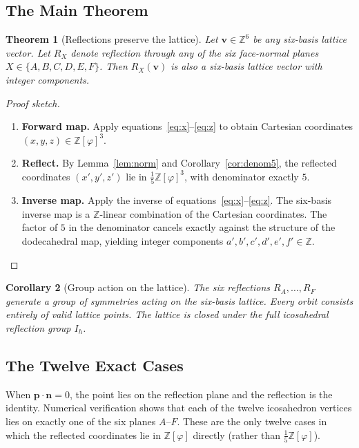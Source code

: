 \documentclass[12pt]{article}
\newtheorem{theorem}{Theorem}[section]
\newtheorem{corollary}[theorem]{Corollary}
\theoremstyle{definition}
\theoremstyle{remark}
\newcommand{\Z}{\mathbb{Z}}
\newcommand{\Zphi}{\mathbb{Z}[\varphi]}
\begin{document}
\subsection{The Main Theorem}

\begin{theorem}[Reflections preserve the lattice]
\label{thm:reflect}
Let $\mathbf{v}\in\Z^6$ be any six-basis lattice vector.  Let $R_X$
denote reflection through any of the six face-normal planes $X\in
\{A,B,C,D,E,F\}$.  Then $R_X(\mathbf{v})$ is also a six-basis lattice
vector with integer components.
\end{theorem}

\begin{proof}[Proof sketch]
\begin{enumerate}[label=\arabic*.,leftmargin=*]
\item \textbf{Forward map.}  Apply equations~\eqref{eq:x}--\eqref{eq:z}
to obtain Cartesian coordinates $(x,y,z)\in\Zphi^3$.

\item \textbf{Reflect.}  By Lemma~\ref{lem:norm} and
Corollary~\ref{cor:denom5}, the reflected coordinates
$(x',y',z')$ lie in $\tfrac{1}{5}\Zphi^3$, with denominator
exactly $5$.

\item \textbf{Inverse map.}  Apply the inverse of
equations~\eqref{eq:x}--\eqref{eq:z}.  The six-basis inverse map
is a $\Z$-linear combination of the Cartesian coordinates.  The
factor of $5$ in the denominator cancels exactly against the
structure of the dodecahedral map, yielding integer components
$a',b',c',d',e',f'\in\Z$.
\end{enumerate}
\end{proof}

\begin{corollary}[Group action on the lattice]
The six reflections $R_A,\ldots,R_F$ generate a group of symmetries
acting on the six-basis lattice.  Every orbit consists entirely of
valid lattice points.  The lattice is closed under the full icosahedral
reflection group $I_h$.
\end{corollary}

\subsection{The Twelve Exact Cases}

When $\mathbf{p}\cdot\mathbf{n} = 0$, the point lies on the reflection
plane and the reflection is the identity.  Numerical verification shows
that each of the twelve icosahedron vertices lies on exactly one of
the six planes $A$--$F$.  These are the only twelve cases in which
the reflected coordinates lie in $\Zphi$ directly (rather than
$\tfrac{1}{5}\Zphi$).
\end{document}
